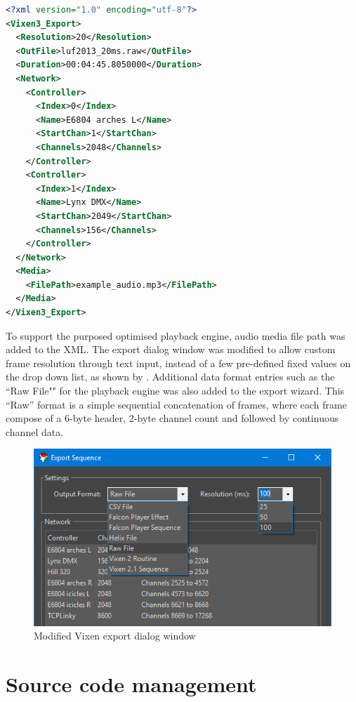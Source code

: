\begin{lstlisting}[float,floatplacement=ht,language=XML,label=lst:network_xml,captionpos=b,caption={\footnotesize Example controller mapping XML file}]
<?xml version="1.0" encoding="utf-8"?>
<Vixen3_Export>
  <Resolution>20</Resolution>
  <OutFile>luf2013_20ms.raw</OutFile>
  <Duration>00:04:45.8050000</Duration>
  <Network>
    <Controller>
      <Index>0</Index>
      <Name>E6804 arches L</Name>
      <StartChan>1</StartChan>
      <Channels>2048</Channels>
    </Controller>
    <Controller>
      <Index>1</Index>
      <Name>Lynx DMX</Name>
      <StartChan>2049</StartChan>
      <Channels>156</Channels>
    </Controller>
  </Network>
  <Media>
    <FilePath>example_audio.mp3</FilePath>
  </Media>
</Vixen3_Export>
\end{lstlisting}

To support the purposed optimised playback engine, audio media file path was added to the XML. The export dialog window was modified to allow custom frame resolution through text input, instead of a few pre-defined fixed values on the drop down list, as shown by . Additional data format entries such as the ``Raw File"" for the playback engine was also added to the export wizard. This ``Raw'' format is a simple sequential concatenation of frames, where each frame compose of a 6-byte header, 2-byte channel count and followed by continuous channel data.

\begin{figure}[t]
  \centering
  \includegraphics[width=0.75\columnwidth]{Figs/vixen_export.png}
  \caption{\footnotesize Modified Vixen export dialog window}
  \label{fig:vixen_export}
\end{figure}

\section{Source code management}

